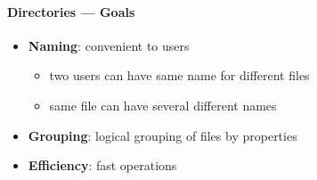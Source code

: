 \paragraph{Directories --- Goals}
\begin{itemize}
  \item \textbf{Naming}: convenient to users
  \begin{itemize}
    \item two users can have same name for different files
    \item same file can have several different names
  \end{itemize}
  \item \textbf{Grouping}: logical grouping of files by properties
  \item \textbf{Efficiency}: fast operations
\end{itemize}

